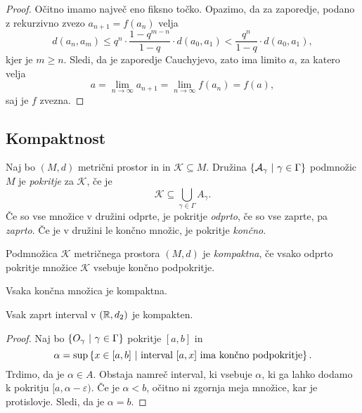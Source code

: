 \documentclass[12pt, a4paper]{article}
\begin{document}
\begin{proof}
Očitno imamo največ eno fiksno točko. Opazimo, da za zaporedje, podano z rekurzivno zvezo $a_{n+1}=f(a_n)$ velja
\[
d(a_n,a_m)\leq q^n\cdot\frac{1-q^{m-n}}{1-q}\cdot d(a_0,a_1)<\frac{q^n}{1-q}\cdot d(a_0,a_1),
\]
kjer je $m\geq n$. Sledi, da je zaporedje Cauchyjevo, zato ima limito $a$, za katero velja
\[
a=\lim_{n\to\infty}a_{n+1}=\lim_{n\to\infty}f(a_n)=f(a),
\]
saj je $f$ zvezna.
\end{proof}

\newpage

\subsection{Kompaktnost}

\begin{definicija}
Naj bo $(M,d)$ metrični prostor in in $\mathcal{K}\subseteq M$. Družina $\left\{\mathcal{A}_\gamma~\middle\vert~\gamma\in\Gamma\right\}$ podmnožic $M$ je \emph{pokritje} za $\mathcal{K}$, če je
\[
\mathcal{K}\subseteq\bigcup_{\gamma\in\Gamma}A_\gamma.
\]
Če so vse množice v družini odprte, je pokritje \emph{odprto}, če so vse zaprte, pa \emph{zaprto}. Če je v družini le končno množic, je pokritje \emph{končno}.
\end{definicija}

\begin{okvir}
\begin{definicija}
Podmnožica $\mathcal{K}$ metričnega prostora $(M,d)$ je \emph{kompaktna}, če vsako odprto pokritje množice $\mathcal{K}$ vsebuje končno podpokritje.
\end{definicija}
\end{okvir}

\begin{opomba}
Vsaka končna množica je kompaktna.
\end{opomba}

\begin{trditev}
Vsak zaprt interval v $(\mathbb{R},d_2)$ je kompakten.
\end{trditev}

\begin{proof}
Naj bo $\left\{O_\gamma~\middle\vert~\gamma\in\Gamma\right\}$ pokritje $[a,b]$ in
\[
\alpha=\sup\left\{x\in[a,b]~\middle\vert~\text{interval $[a,x]$ ima končno podpokritje}\right\}.
\]
Trdimo, da je $\alpha\in A$. Obstaja namreč interval, ki vsebuje $\alpha$, ki ga lahko dodamo k pokritju $[a,\alpha-\varepsilon)$. Če je $\alpha<b$, očitno ni zgornja meja množice, kar je protislovje. Sledi, da je $\alpha=b$.
\end{proof}
\end{document}
